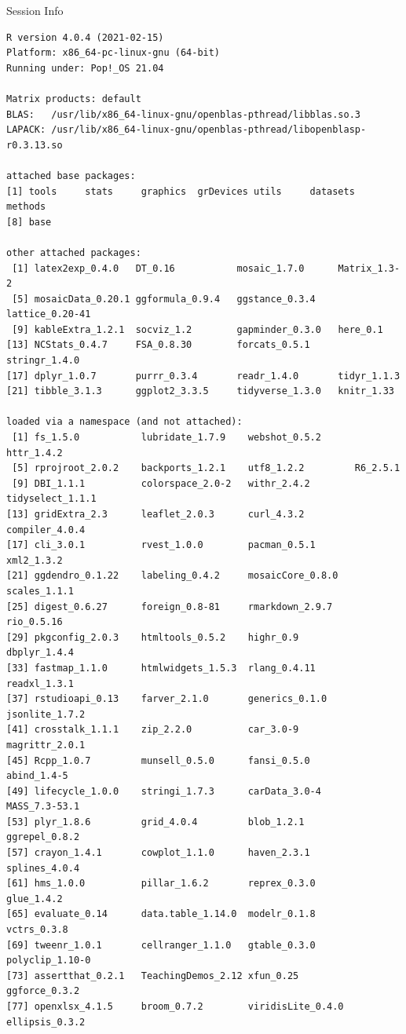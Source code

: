 \documentclass[10pt]{beamer}\usepackage[]{graphicx}\usepackage[]{color}
\makeatletter
\newenvironment{kframe}{%
 \def\at@end@of@kframe{}%
 \ifinner\ifhmode%
  \def\at@end@of@kframe{\end{minipage}}%
  \begin{minipage}{\columnwidth}%
 \fi\fi%
 \def\FrameCommand##1{\hskip\@totalleftmargin \hskip-\fboxsep
 \colorbox{shadecolor}{##1}\hskip-\fboxsep
     \hskip-\linewidth \hskip-\@totalleftmargin \hskip\columnwidth}%
 \MakeFramed {\advance\hsize-\width
   \@totalleftmargin\z@ \linewidth\hsize
   \@setminipage}}%
 {\par\unskip\endMakeFramed%
 \at@end@of@kframe}
\newenvironment{knitrout}{}{} %
\makeatother
\begin{document}
\begin{frame}[fragile]{Session Info}
	\tiny
	
\begin{knitrout}\tiny
{}\color{fgcolor}\begin{kframe}
\begin{verbatim}
R version 4.0.4 (2021-02-15)
Platform: x86_64-pc-linux-gnu (64-bit)
Running under: Pop!_OS 21.04

Matrix products: default
BLAS:   /usr/lib/x86_64-linux-gnu/openblas-pthread/libblas.so.3
LAPACK: /usr/lib/x86_64-linux-gnu/openblas-pthread/libopenblasp-r0.3.13.so

attached base packages:
[1] tools     stats     graphics  grDevices utils     datasets  methods  
[8] base     

other attached packages:
 [1] latex2exp_0.4.0   DT_0.16           mosaic_1.7.0      Matrix_1.3-2     
 [5] mosaicData_0.20.1 ggformula_0.9.4   ggstance_0.3.4    lattice_0.20-41  
 [9] kableExtra_1.2.1  socviz_1.2        gapminder_0.3.0   here_0.1         
[13] NCStats_0.4.7     FSA_0.8.30        forcats_0.5.1     stringr_1.4.0    
[17] dplyr_1.0.7       purrr_0.3.4       readr_1.4.0       tidyr_1.1.3      
[21] tibble_3.1.3      ggplot2_3.3.5     tidyverse_1.3.0   knitr_1.33       

loaded via a namespace (and not attached):
 [1] fs_1.5.0           lubridate_1.7.9    webshot_0.5.2      httr_1.4.2        
 [5] rprojroot_2.0.2    backports_1.2.1    utf8_1.2.2         R6_2.5.1          
 [9] DBI_1.1.1          colorspace_2.0-2   withr_2.4.2        tidyselect_1.1.1  
[13] gridExtra_2.3      leaflet_2.0.3      curl_4.3.2         compiler_4.0.4    
[17] cli_3.0.1          rvest_1.0.0        pacman_0.5.1       xml2_1.3.2        
[21] ggdendro_0.1.22    labeling_0.4.2     mosaicCore_0.8.0   scales_1.1.1      
[25] digest_0.6.27      foreign_0.8-81     rmarkdown_2.9.7    rio_0.5.16        
[29] pkgconfig_2.0.3    htmltools_0.5.2    highr_0.9          dbplyr_1.4.4      
[33] fastmap_1.1.0      htmlwidgets_1.5.3  rlang_0.4.11       readxl_1.3.1      
[37] rstudioapi_0.13    farver_2.1.0       generics_0.1.0     jsonlite_1.7.2    
[41] crosstalk_1.1.1    zip_2.2.0          car_3.0-9          magrittr_2.0.1    
[45] Rcpp_1.0.7         munsell_0.5.0      fansi_0.5.0        abind_1.4-5       
[49] lifecycle_1.0.0    stringi_1.7.3      carData_3.0-4      MASS_7.3-53.1     
[53] plyr_1.8.6         grid_4.0.4         blob_1.2.1         ggrepel_0.8.2     
[57] crayon_1.4.1       cowplot_1.1.0      haven_2.3.1        splines_4.0.4     
[61] hms_1.0.0          pillar_1.6.2       reprex_0.3.0       glue_1.4.2        
[65] evaluate_0.14      data.table_1.14.0  modelr_0.1.8       vctrs_0.3.8       
[69] tweenr_1.0.1       cellranger_1.1.0   gtable_0.3.0       polyclip_1.10-0   
[73] assertthat_0.2.1   TeachingDemos_2.12 xfun_0.25          ggforce_0.3.2     
[77] openxlsx_4.1.5     broom_0.7.2        viridisLite_0.4.0  ellipsis_0.3.2    
\end{verbatim}
\end{kframe}
\end{knitrout}
	
\end{frame}
\end{document}
